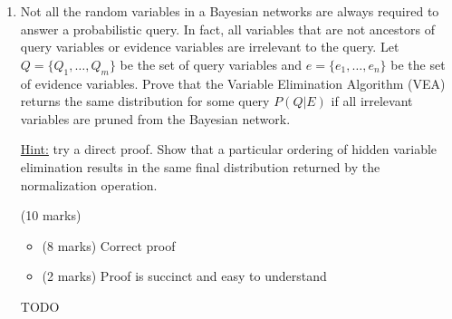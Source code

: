 \documentclass[12pt]{article}
\begin{document}
\begin{enumerate}[font=\Large,label=(\alph*)]
    \underline{Hint:} Consider using the fundamental conditional independence relationships discussed in Lecture 8.
    
    \newpage
    \begin{markscheme}
    (10 marks)
    \begin{itemize}
    \item
    (8 marks) Correct proof
    \item
    (2 marks) Proof is succinct and easy to understand
    \end{itemize}
    \end{markscheme}

    \begin{sol}
        {\color{blue} 
        For X to be conditionally independent with any node N given B , there should not be a path from X to N that does not go through B. Since B includes all children and parents of X, this holds for all N and thus X is conditionally independent of every variable in the network,conditioned on its Markov blanket
        }
        \end{sol}
    
    \item Not all the random variables in a Bayesian networks are always required to answer a probabilistic query. In fact, all variables that are not ancestors of query variables or evidence variables are irrelevant to the query. Let $Q = \{Q_1, \hdots, Q_m\}$ be the set of query variables and $e = \{e_1, \hdots,e_n\}$ be the set of evidence variables. Prove that the Variable Elimination Algorithm (VEA) returns the same distribution for some query $P(Q|E)$ if all irrelevant variables are pruned from the Bayesian network.
    
    \underline{Hint:} try a direct proof. Show that a particular ordering of hidden variable elimination results in the same final distribution returned by the normalization operation.
    
    \begin{markscheme}
    (10 marks)
    
    \begin{itemize}
    \item
    (8 marks) Correct proof
    \item
    (2 marks) Proof is succinct and easy to understand
    \end{itemize}
    \end{markscheme}

    \begin{sol}
        {\color{blue} 
            TODO
        }
        \end{sol}

\end{enumerate}
\end{document}
